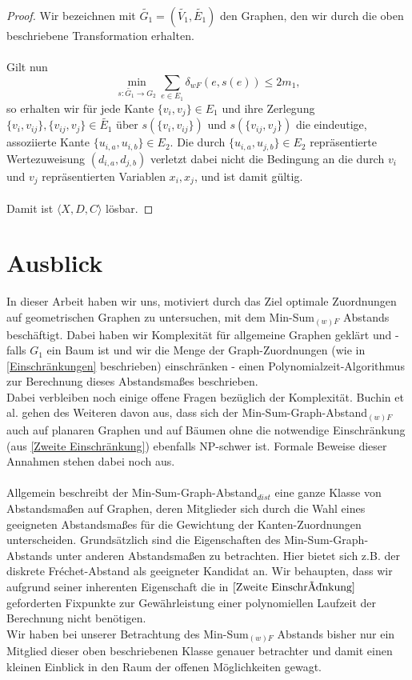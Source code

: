 \documentclass[a4paper, 12pt, twoside]{article}
\theoremstyle{Format1} %
\begin{document}
\begin{proof}
Wir bezeichnen mit $\tilde{G_1}=(\tilde{V_1}, \tilde{E_1})$ den Graphen, den wir durch die oben beschriebene Transformation erhalten.
\\
\\
Gilt nun
$$ \min_{s: \tilde{G_1} \to G_2} \sum_{e \in E_1} \delta_{wF}(e, s(e)) \leq 2m_1, $$
so erhalten wir für jede Kante $\{v_i, v_j\} \in E_1$ und ihre Zerlegung $\{v_i, v_{ij}\},\{v_{ij}, v_j\} \in \tilde{E_1}$
über $s(\{v_i, v_{ij}\})$ und $s(\{v_{ij}, v_j\})$ die eindeutige, assoziierte Kante $\{u_{i,a}, u_{i,b}\} \in E_2$.
Die durch $\{u_{i,a}, u_{j,b}\} \in E_2$ repräsentierte Wertezuweisung $(d_{i,a}, d_{j,b})$ verletzt dabei nicht die Bedingung an die
durch $v_i$ und $v_j$ repräsentierten Variablen $x_i, x_j$, und ist damit gültig.
\\
\\
Damit ist $\langle X,D,C \rangle$ lösbar.
\end{proof}


\section{Ausblick}
In dieser Arbeit haben wir uns, motiviert durch das Ziel optimale Zuordnungen auf geometrischen Graphen zu untersuchen, mit dem
Min-Sum$_{(w)F}$ Abstands beschäftigt. Dabei haben wir Komplexität für allgemeine
Graphen geklärt und - falls $G_1$ ein Baum ist und wir die Menge der Graph-Zuordnungen (wie in \ref{Einschränkungen} beschrieben) einschränken -
einen Polynomialzeit-Algorithmus zur Berechnung dieses Abstandsmaßes beschrieben.
\\
Dabei verbleiben noch einige offene Fragen bezüglich der Komplexität.
Buchin et al. gehen des Weiteren davon aus, dass sich der Min-Sum-Graph-Abstand$_{(w)F}$ auch auf planaren Graphen und
auf Bäumen ohne die notwendige Einschränkung (aus \ref{Zweite Einschränkung}) ebenfalls NP-schwer ist.
Formale Beweise dieser Annahmen stehen dabei noch aus.
\\
\\
Allgemein beschreibt der Min-Sum-Graph-Abstand$_{dist}$ eine ganze Klasse von Abstandsmaßen auf Graphen, deren Mitglieder sich durch die Wahl
eines geeigneten Abstandsmaßes für die Gewichtung der Kanten-Zuordnungen unterscheiden.
Grundsätzlich sind die Eigenschaften des Min-Sum-Graph-Abstands unter anderen Abstandsmaßen zu betrachten. Hier bietet sich z.B. der
diskrete Fréchet-Abstand als geeigneter Kandidat an. Wir behaupten, dass wir aufgrund seiner inherenten Eigenschaft die in $\ref{Zweite Einschränkung}$
geforderten Fixpunkte zur Gewährleistung einer polynomiellen Laufzeit der Berechnung nicht benötigen.
\\
Wir haben bei unserer Betrachtung des Min-Sum$_{(w)F}$ Abstands bisher nur ein Mitglied dieser oben beschriebenen Klasse genauer betrachter und
damit einen kleinen Einblick in den Raum der offenen Möglichkeiten gewagt.
\newpage\null\thispagestyle{empty}\newpage
\end{document}
